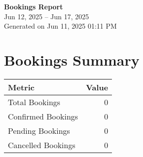 \documentclass[a4paper,12pt]{article}
\begin{document}
\begin{center}
\textbf{\LARGE Bookings Report}\\
\vspace{0.2cm}
Jun 12, 2025 -- Jun 17, 2025\\
\vspace{0.2cm}
Generated on Jun 11, 2025 01:11 PM
\end{center}
\vspace{1cm}
\section*{Bookings Summary}
\begin{tabular}{lr}
\toprule
Metric & Value \\
\midrule
Total Bookings & 0 \\
Confirmed Bookings & 0 \\
Pending Bookings & 0 \\
Cancelled Bookings & 0 \\
\bottomrule
\end{tabular}
\end{document}
